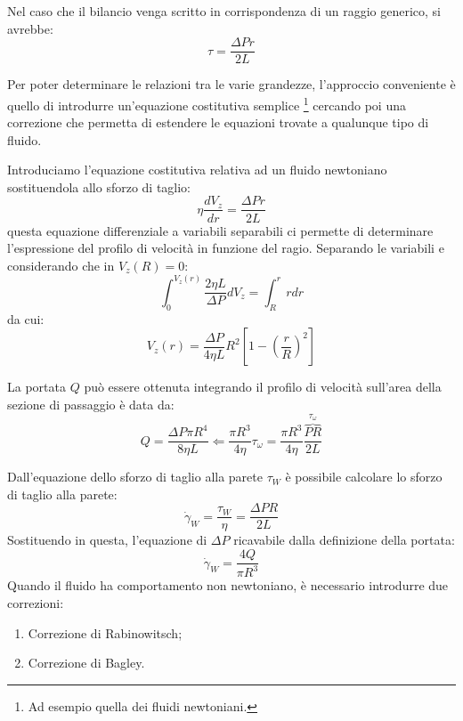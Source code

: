 Nel caso che il bilancio venga scritto in corrispondenza di un raggio generico, si avrebbe:
\begin{equation}
\tau = \frac{\Delta P r}{2 L}
\end{equation}

Per poter determinare le relazioni tra le varie grandezze, l'approccio conveniente è quello di introdurre un'equazione costitutiva semplice%
\footnote{Ad esempio quella dei fluidi newtoniani.}
cercando poi una correzione che permetta di estendere le equazioni trovate a qualunque tipo di fluido.

Introduciamo l'equazione costitutiva relativa ad un fluido newtoniano sostituendola allo sforzo di taglio:
\begin{equation}
\eta \frac{d V_z}{dr} = \frac{\Delta P r}{2 L}
\end{equation}
questa equazione differenziale a variabili separabili ci permette di determinare l'espressione del profilo di velocità in funzione del ragio. Separando le variabili e considerando che in $V_z(R) = 0$:
\begin{equation}
\int_0^{V_z(r)}{\frac{2\eta L}{\Delta P} dV_z} = \int_R^r rdr
\end{equation}
da cui:
\begin{equation}
V_z(r) = \frac{\Delta P}{4 \eta L} R^2 \left[1 - \left(\frac{r}{R}\right)^2\right] 
\end{equation}

La portata $Q$ può essere ottenuta integrando il profilo di velocità sull'area della sezione di passaggio è data da:
\begin{equation}
Q = \frac{\Delta P \pi R^4}{8 \eta L} \Leftarrow%
\frac{\pi R^3}{4 \eta} \tau_{\omega} =%
\frac{\pi R^3}{4 \eta} \frac{\overbrace{P R}^{\tau_{\omega}}}{2L}
\end{equation}

Dall'equazione dello sforzo di taglio alla parete $\tau_W$ è possibile calcolare lo sforzo di taglio alla parete:
\begin{equation}
\dot{\gamma}_W = \frac{\tau_W}{\eta} = \frac{\Delta P R}{2 L}
\end{equation}
Sostituendo in questa, l'equazione di $\Delta P$ ricavabile dalla definizione della portata:
\begin{equation}
\dot{\gamma}_W = \frac{4Q}{\pi R^3}
\end{equation}
Quando il fluido ha comportamento non newtoniano, è necessario introdurre due correzioni:
\begin{enumerate}
\item Correzione di Rabinowitsch;
\item Correzione di Bagley.
\end{enumerate}

